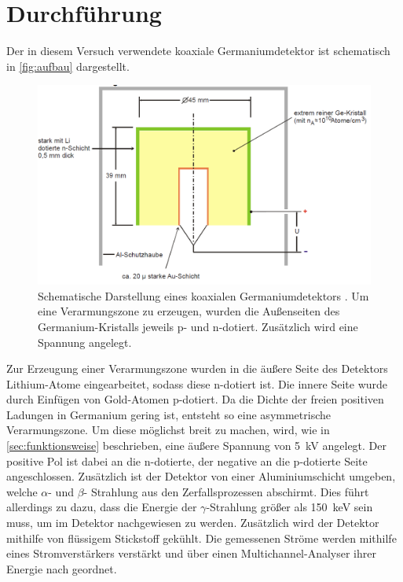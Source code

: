 \section{Durchführung}
\label{sec:durchfuehrung}

Der in diesem Versuch verwendete koaxiale Germaniumdetektor ist schematisch in \autoref{fig:aufbau} dargestellt.
\begin{figure}
    \centering
    \includegraphics[width=\textwidth]{content/img/Abb_1.png}
    \caption{Schematische Darstellung eines koaxialen Germaniumdetektors \cite{versuchsanleitung}.
    Um eine Verarmungszone zu erzeugen,
    wurden die Außenseiten des Germanium-Kristalls jeweils p- und n-dotiert.
    Zusätzlich wird eine Spannung angelegt.}
    \label{fig:aufbau}
\end{figure}

Zur Erzeugung einer Verarmungszone wurden in die äußere Seite des Detektors Lithium-Atome eingearbeitet,
sodass diese n-dotiert ist.
Die innere Seite wurde durch Einfügen von Gold-Atomen p-dotiert.
Da die Dichte der freien positiven Ladungen in Germanium gering ist,
entsteht so eine asymmetrische Verarmungszone.
Um diese möglichst breit zu machen,
wird,
wie in \autoref{sec:funktionsweise} beschrieben,
eine äußere Spannung von \SI{5}{\kilo\volt} angelegt.
Der positive Pol ist dabei an die n-dotierte,
der negative an die p-dotierte Seite angeschlossen.
Zusätzlich ist der Detektor von einer Aluminiumschicht umgeben,
welche $\alpha$- und $\beta$- Strahlung aus den Zerfallsprozessen abschirmt.
Dies führt allerdings zu dazu,
dass die Energie der $\gamma$-Strahlung größer als \SI{150}{\kilo\eV} sein muss, um im Detektor nachgewiesen zu werden.
Zusätzlich wird der Detektor mithilfe von flüssigem Stickstoff gekühlt.
Die gemessenen Ströme werden mithilfe eines Stromverstärkers verstärkt und über einen Multichannel-Analyser ihrer Energie nach geordnet.

